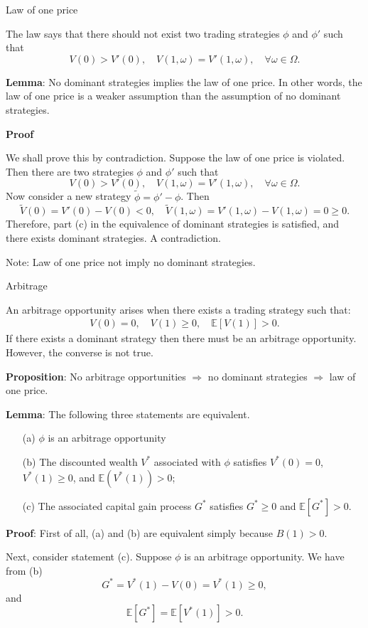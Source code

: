 \documentclass{beamer}
\begin{document}
\begin{frame}{Law of one price}

    {\footnotesize \footnotesize
    The law says that there should not exist two trading strategies $\phi$ and $\phi'$ such that  
    \[
    V(0) > V'(0), \quad V(1, \omega) = V'(1, \omega), \quad \forall \omega \in \Omega.
    \]
    \par \textbf{Lemma}: No dominant strategies implies the law of one price. In other words, 
    the law of one price is a weaker assumption than the assumption of no dominant strategies.
    \par  \pause \textbf{Proof}
    \par We shall prove this by contradiction. Suppose the law of one price is violated. Then there are two strategies $\phi$ and $\phi'$ such that  
\[
V(0) > V'(0), \quad V(1, \omega) = V'(1, \omega), \quad \forall \omega \in \Omega.
\]  
Now consider a new strategy $\tilde{\phi} = \phi' - \phi$. Then  
\[
\tilde{V}(0) = V'(0) - V(0) < 0, \quad \tilde{V}(1, \omega) = V'(1, \omega) - V(1, \omega) = 0 \geq 0.
\]  
Therefore, part (c) in the equivalence of dominant strategies is satisfied, and there exists dominant strategies. A contradiction.
\par \pause  Note: Law of one price not imply no dominant strategies.
    }
\end{frame}

\begin{frame}{Arbitrage}

    {\footnotesize \footnotesize
     An arbitrage opportunity arises when there exists a trading strategy such that:
     \begin{align*}
        V(0)=0,\quad V(1)\geq 0,\quad \mathbb{E}[V(1)]>0.
     \end{align*}
    If there exists a dominant strategy then there must be an arbitrage opportunity. 
     However, the converse is not true.
     \par  \pause \textbf{Proposition}: No arbitrage opportunities $\Rightarrow$ no 
     dominant strategies $\Rightarrow$ law of one price.
     \par \textbf{Lemma}: The following three statements are equivalent.
     \begin{enumerate}
        \item[(a)] $\phi$ is an arbitrage opportunity
        \item[(b)] The discounted wealth $V^*$ associated with $\phi$ satisfies $V^*(0) = 0$, $V^*(1) \geq 0$, and $\mathbb{E}(V^*(1)) > 0$;
        \item[(c)] The associated capital gain process $G^*$ satisfies $G^* \geq 0$ and $\mathbb{E}[G^*] > 0$.
        \end{enumerate}
    \par  \pause \textbf{Proof}:
    First of all, (a) and (b) are equivalent simply because $B(1) > 0$.

Next, consider statement (c). Suppose $\phi$ is an arbitrage opportunity. We have from (b)
\[
G^* = V^*(1) - V(0) = V^*(1) \geq 0,
\]
and
\[
\mathbb{E}[G^*] = \mathbb{E}[V^*(1)] > 0.
\]
    }
\end{frame}
\end{document}
